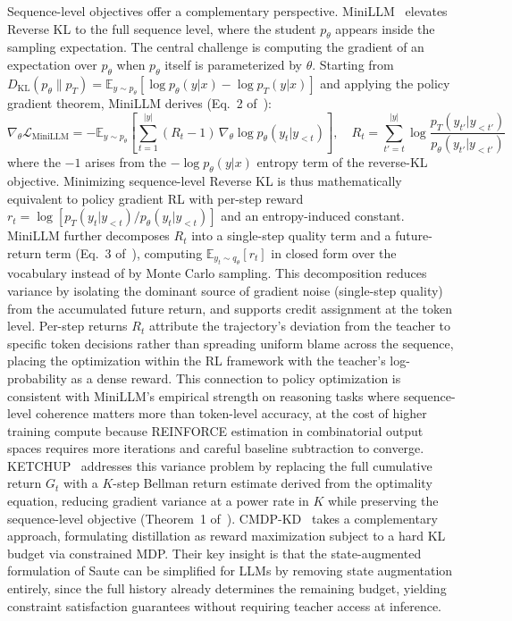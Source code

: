 \documentclass{article} %
\newcommand{\E}{\mathbb{E}}
\newcommand{\KL}{D_{\mathrm{KL}}}
\newcommand{\ptheta}{p_\theta}
\newcommand{\pteacher}{p_T}
\newcommand{\loss}{\mathcal{L}}
\begin{document}
Sequence-level objectives offer a complementary perspective. MiniLLM~\citep{2306.08543} elevates Reverse KL to the full sequence level, where the student $\ptheta$ appears inside the sampling expectation. The central challenge is computing the gradient of an expectation over $\ptheta$ when $\ptheta$ itself is parameterized by $\theta$. Starting from $\KL(\ptheta \parallel \pteacher) = \E_{y \sim \ptheta}[\log \ptheta(y|x) - \log \pteacher(y|x)]$ and applying the policy gradient theorem, MiniLLM derives (Eq.~2 of~\citealp{2306.08543}):
\begin{equation}
    \nabla_\theta \loss_{\text{MiniLLM}} = -\E_{y \sim \ptheta} \left[ \sum_{t=1}^{|y|} (R_t - 1)\, \nabla_\theta \log \ptheta(y_t|y_{<t}) \right],\quad R_t = \sum_{t'=t}^{|y|} \log \frac{\pteacher(y_{t'}|y_{<t'})}{\ptheta(y_{t'}|y_{<t'})}
\end{equation}
where the $-1$ arises from the $-\log \ptheta(y|x)$ entropy term of the reverse-KL objective. Minimizing sequence-level Reverse KL is thus mathematically equivalent to policy gradient RL with per-step reward $r_t = \log[\pteacher(y_t|y_{<t}) / \ptheta(y_t|y_{<t})]$ and an entropy-induced constant. MiniLLM further decomposes $R_t$ into a single-step quality term and a future-return term (Eq.~3 of~\citealp{2306.08543}), computing $\E_{y_t \sim q_\theta}[r_t]$ in closed form over the vocabulary instead of by Monte Carlo sampling. This decomposition reduces variance by isolating the dominant source of gradient noise (single-step quality) from the accumulated future return, and supports credit assignment at the token level. Per-step returns $R_t$ attribute the trajectory's deviation from the teacher to specific token decisions rather than spreading uniform blame across the sequence, placing the optimization within the RL framework with the teacher's log-probability as a dense reward. This connection to policy optimization is consistent with MiniLLM's empirical strength on reasoning tasks where sequence-level coherence matters more than token-level accuracy, at the cost of higher training compute because REINFORCE estimation in combinatorial output spaces requires more iterations and careful baseline subtraction to converge. KETCHUP~\citep{2504.19024} addresses this variance problem by replacing the full cumulative return $G_t$ with a $K$-step Bellman return estimate derived from the optimality equation, reducing gradient variance at a power rate in $K$ while preserving the sequence-level objective (Theorem~1 of~\citealp{2504.19024}). CMDP-KD~\citep{2509.22921} takes a complementary approach, formulating distillation as reward maximization subject to a hard KL budget via constrained MDP. Their key insight is that the state-augmented formulation of Saute can be simplified for LLMs by removing state augmentation entirely, since the full history already determines the remaining budget, yielding constraint satisfaction guarantees without requiring teacher access at inference.
\end{document}
